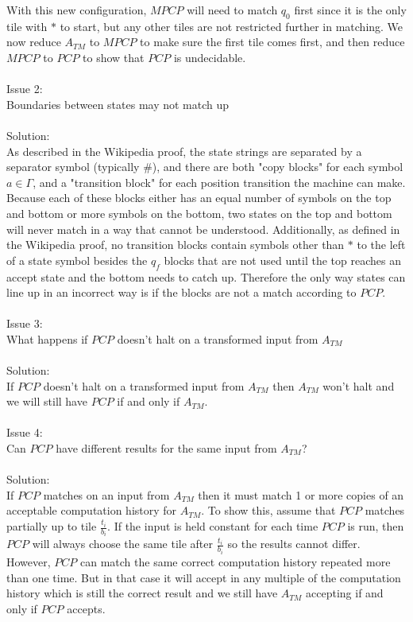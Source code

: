 \documentclass[letterpaper,notitlepage,twoside]{article}
\begin{document}
With this new configuration, $MPCP$ will need to match $q_0$ first since it is the only tile with $*$ to start, but any other tiles are not restricted further in matching. We now reduce $A_{TM}$ to $MPCP$ to make sure the first tile comes first, and then reduce $MPCP$ to $PCP$ to show that $PCP$ is undecidable.
\\\\
Issue 2:\\
Boundaries between states may not match up\\\\
Solution:\\
As described in the Wikipedia proof, the state strings are separated by a separator symbol (typically \#), and there are both "copy blocks" for each symbol $a \in \Gamma$, and a "transition block" for each position transition the machine can make. Because each of these blocks either has an equal number of symbols on the top and bottom or more symbols on the bottom, two states on the top and bottom will never match in a way that cannot be understood. Additionally, as defined in the Wikipedia proof, no transition blocks contain symbols other than $*$ to the left of a state symbol besides the $q_f$ blocks that are not used until the top reaches an accept state and the bottom needs to catch up. Therefore the only way states can line up in an incorrect way is if the blocks are not a match according to $PCP$.
\\\\
Issue 3:\\
What happens if $PCP$ doesn't halt on a transformed input from $A_{TM}$\\\\
Solution:\\
If $PCP$ doesn't halt on a transformed input from $A_{TM}$ then $A_{TM}$ won't halt and we will still have $PCP$ if and only if $A_{TM}$. 
\\\\
Issue 4:\\
Can $PCP$ have different results for the same input from $A_{TM}$?\\\\
Solution:\\
If $PCP$ matches on an input from $A_{TM}$ then it must match 1 or more copies of an acceptable computation history for $A_{TM}$. To show this, assume that $PCP$  matches partially up to tile $\frac{t_i}{b_i}$. If the input is held constant for each time $PCP$ is run, then $PCP$ will always choose the same tile after $\frac{t_i}{b_i}$ so the results cannot differ. However, $PCP$ can match the same correct computation history repeated more than one time. But in that case it will accept in any multiple of the computation history which is still the correct result and we still have $A_{TM}$ accepting if and only if $PCP$ accepts.
\end{document}
